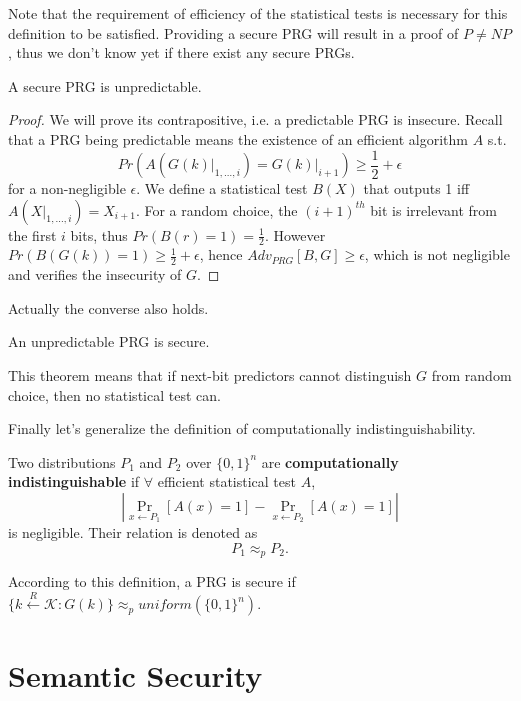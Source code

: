 Note that the requirement of efficiency of the statistical tests is necessary for this definition to be satisfied. Providing a secure PRG will result in a proof of $P\neq NP$, thus we don't know yet if there exist any secure PRGs. 
\begin{theorem}
A secure PRG is unpredictable.
\end{theorem}
\begin{proof}
We will prove its contrapositive, i.e. a predictable PRG is insecure. Recall that a PRG being predictable means the existence of an efficient algorithm $A$ s.t.
\begin{equation*}
Pr\left(A\left(\left.G(k)\right\vert_{1,\dots,i}\right)=\left.G(k)\right\vert_{i+1}\right)\geq\frac{1}{2}+\epsilon
\end{equation*}
for a non-negligible $\epsilon$. We define a statistical test $B(X)$ that outputs 1 iff $A(X|_{1,\dots,i})=X_{i+1}$. For a random choice, the $(i+1)^{th}$ bit is irrelevant from the first $i$ bits, thus $Pr(B(r)=1)=\frac{1}{2}.$ However $Pr(B(G(k))=1)\geq \frac{1}{2}+\epsilon$, hence $Adv_{PRG}[B,G]\geq\epsilon$, which is not negligible and verifies the insecurity of $G$.
\end{proof}
Actually the converse also holds.
\begin{theorem}
An unpredictable PRG is secure.
\end{theorem}
This theorem means that if next-bit predictors cannot distinguish $G$ from random choice, then no statistical test can. 

Finally let's generalize the definition of computationally indistinguishability.
\begin{definition}
Two distributions $P_1$ and $P_2$ over $\{0,1\}^n$ are \textbf{computationally indistinguishable} if $\forall$ efficient statistical test $A$, \[\left\lvert\mathop{Pr}\limits_{x\leftarrow P_1}[A(x)=1]-\mathop{Pr}\limits_{x\leftarrow P_2}[A(x)=1]\right\rvert\] is negligible. Their relation is denoted as 
\[P_1\approx_p P_2.\]
\end{definition}
According to this definition, a PRG is secure if $\{k\xleftarrow{R}\mathcal{K}:G(k)\}\approx_p uniform(\{0,1\}^n).$
\section{Semantic Security}

\ifx\PREAMBLE\undefined

\fi